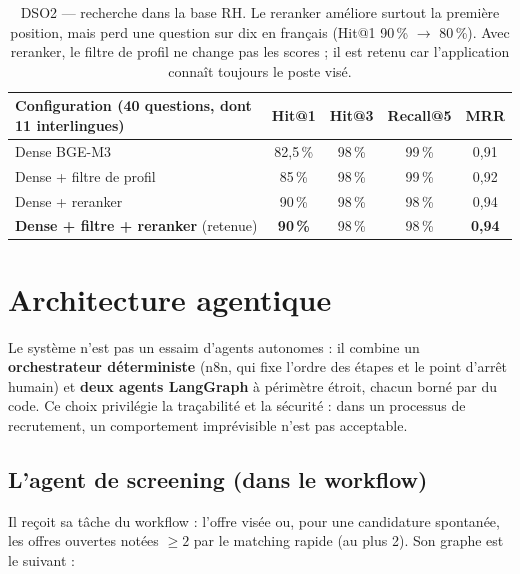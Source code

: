 \documentclass[11pt,a4paper]{report}
\begin{document}
\begin{table}[ht]
\centering\small
\begin{tabular}{lcccc}
\toprule
\textbf{Configuration} (40 questions, dont 11 interlingues) & \textbf{Hit@1} & \textbf{Hit@3} & \textbf{Recall@5} & \textbf{MRR}\\
\midrule
Dense BGE-M3 & 82,5\,\% & 98\,\% & 99\,\% & 0,91\\
Dense + filtre de profil & 85\,\% & 98\,\% & 99\,\% & 0,92\\
Dense + reranker & 90\,\% & 98\,\% & 98\,\% & 0,94\\
\textbf{Dense + filtre + reranker} (retenue) & \textbf{90\,\%} & 98\,\% & 98\,\% & \textbf{0,94}\\
\bottomrule
\end{tabular}
\caption{DSO2 --- recherche dans la base RH. Le reranker améliore surtout la première position, mais perd une question sur dix en français (Hit@1 90\,\% $\rightarrow$ 80\,\%). Avec reranker, le filtre de profil ne change pas les scores ; il est retenu car l'application connaît toujours le poste visé.}
\label{tab:rag}
\end{table}

\chapter{Architecture agentique}

Le système n'est pas un \og essaim\fg{} d'agents autonomes : il combine un \textbf{orchestrateur déterministe} (n8n, qui fixe l'ordre des étapes et le point d'arrêt humain) et \textbf{deux agents LangGraph} à périmètre étroit, chacun borné par du code. Ce choix privilégie la traçabilité et la sécurité : dans un processus de recrutement, un comportement imprévisible n'est pas acceptable.

\section{L'agent de screening (dans le workflow)}

Il reçoit sa tâche du workflow : l'offre visée ou, pour une candidature spontanée, les offres ouvertes notées $\geq 2$ par le matching rapide (au plus 2). Son graphe est le suivant :
\end{document}
